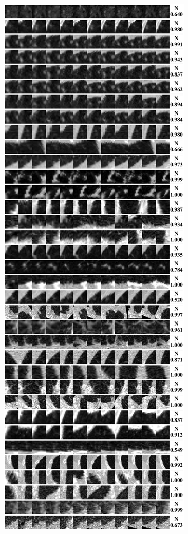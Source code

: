 \documentclass[onecolumn]{IEEEtran}
\begin{document}
\begin{figure}[H]
{\includegraphics[width=0.45\columnwidth]{./images/elcap-msnodules-nonnodule1}
}
\end{figure}
\newpage
\end{document}

